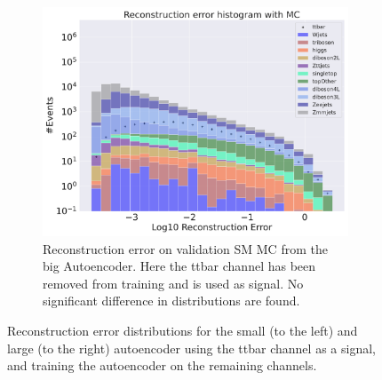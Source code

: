 \begin{figure}[h!]
\begin{subfigure}{.45\textwidth}
        \includegraphics[width=\textwidth]{Figures/AE_testing/big/b_data_recon_big_rm3_feats_sig_ttbar.pdf}
        \caption{Reconstruction error on validation SM MC from the big Autoencoder. Here the ttbar channel has been removed from training and 
        is used as signal. No significant difference in distributions are found. }
        \label{fig:ae_big_ttbar}
    \end{subfigure}
    \hfill 
    \caption[AE | Reconstruction error using ttbar channel as signal]{Reconstruction error distributions for the small (to the left) and large (to the right) autoencoder using the ttbar channel as a signal, and 
    training the autoencoder on the remaining channels. }
    \label{fig:ae_big_channel_3}
\end{figure}



